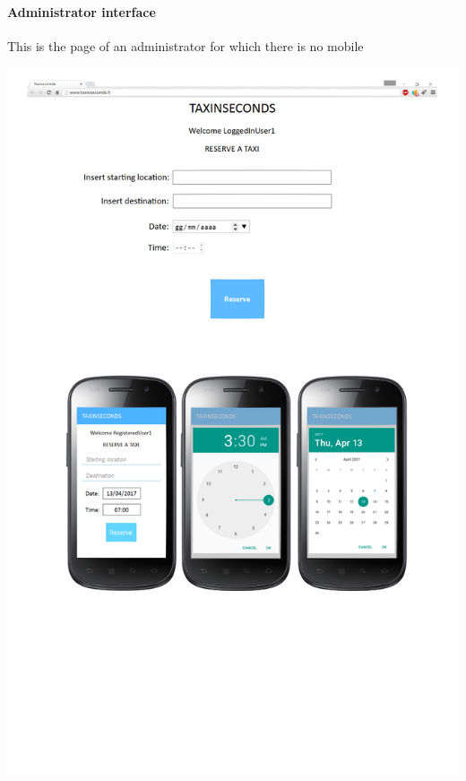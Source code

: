 \documentclass{article}
\begin{document}
\paragraph{Administrator interface}
This is the page of an administrator for which there is no mobile\\ 
\begin{center}
	\includegraphics[width=.8\textwidth,height=.8\textheight,keepaspectratio]{ReserveTaxi}
\end{center}
\clearpage
\end{document}
